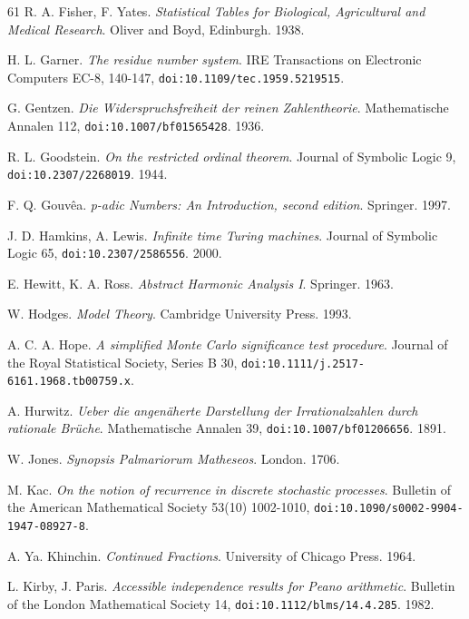 \begin{thebibliography}{61}
R. A. Fisher, F. Yates. \emph{Statistical Tables for Biological, Agricultural and Medical Research}. Oliver and Boyd, Edinburgh. 1938.

H. L. Garner. \emph{The residue number system}. IRE Transactions on Electronic Computers EC-8, 140-147, \texttt{doi:10.1109/\allowbreak{}tec.1959.5219515}.

G. Gentzen. \emph{Die Widerspruchsfreiheit der reinen Zahlentheorie}. Mathematische Annalen 112, \texttt{doi:10.1007/\allowbreak{}bf01565428}. 1936.

R. L. Goodstein. \emph{On the restricted ordinal theorem}. Journal of Symbolic Logic 9, \texttt{doi:10.2307/\allowbreak{}2268019}. 1944.

F. Q. Gouvêa. \emph{p-adic Numbers: An Introduction, second edition}. Springer. 1997.

J. D. Hamkins, A. Lewis. \emph{Infinite time Turing machines}. Journal of Symbolic Logic 65, \texttt{doi:10.2307/\allowbreak{}2586556}. 2000.

E. Hewitt, K. A. Ross. \emph{Abstract Harmonic Analysis I}. Springer. 1963.

W. Hodges. \emph{Model Theory}. Cambridge University Press. 1993.

A. C. A. Hope. \emph{A simplified Monte Carlo significance test procedure}. Journal of the Royal Statistical Society, Series B 30, \texttt{doi:10.1111/\allowbreak{}j.2517-6161.1968.tb00759.x}.

A. Hurwitz. \emph{Ueber die angenäherte Darstellung der Irrationalzahlen durch rationale Brüche}. Mathematische Annalen 39, \texttt{doi:10.1007/\allowbreak{}bf01206656}. 1891.

W. Jones. \emph{Synopsis Palmariorum Matheseos}. London. 1706.

M. Kac. \emph{On the notion of recurrence in discrete stochastic processes}. Bulletin of the American Mathematical Society 53(10) 1002-1010, \texttt{doi:10.1090/\allowbreak{}s0002-9904-1947-08927-8}.

A. Ya. Khinchin. \emph{Continued Fractions}. University of Chicago Press. 1964.

L. Kirby, J. Paris. \emph{Accessible independence results for Peano arithmetic}. Bulletin of the London Mathematical Society 14, \texttt{doi:10.1112/\allowbreak{}blms/\allowbreak{}14.4.285}. 1982.


\end{thebibliography}

